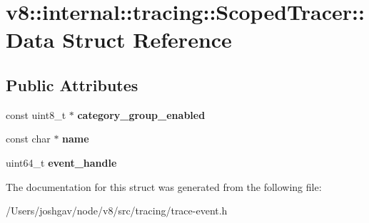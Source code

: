 \hypertarget{structv8_1_1internal_1_1tracing_1_1_scoped_tracer_1_1_data}{}\section{v8\+:\+:internal\+:\+:tracing\+:\+:Scoped\+Tracer\+:\+:Data Struct Reference}
\label{structv8_1_1internal_1_1tracing_1_1_scoped_tracer_1_1_data}
\subsection*{Public Attributes}
\begin{DoxyCompactItemize}
\item 
const uint8\+\_\+t $\ast$ {\bfseries category\+\_\+group\+\_\+enabled}\hypertarget{structv8_1_1internal_1_1tracing_1_1_scoped_tracer_1_1_data_aba3c14cfc0abee90f34482ca29ae26d3}{}\label{structv8_1_1internal_1_1tracing_1_1_scoped_tracer_1_1_data_aba3c14cfc0abee90f34482ca29ae26d3}

\item 
const char $\ast$ {\bfseries name}\hypertarget{structv8_1_1internal_1_1tracing_1_1_scoped_tracer_1_1_data_a77c0f1d3bad9bf811dc1403c6460cee6}{}\label{structv8_1_1internal_1_1tracing_1_1_scoped_tracer_1_1_data_a77c0f1d3bad9bf811dc1403c6460cee6}

\item 
uint64\+\_\+t {\bfseries event\+\_\+handle}\hypertarget{structv8_1_1internal_1_1tracing_1_1_scoped_tracer_1_1_data_a490036821d9ea4658410f0c0aafa9508}{}\label{structv8_1_1internal_1_1tracing_1_1_scoped_tracer_1_1_data_a490036821d9ea4658410f0c0aafa9508}

\end{DoxyCompactItemize}


The documentation for this struct was generated from the following file\+:\begin{DoxyCompactItemize}
\item 
/\+Users/joshgav/node/v8/src/tracing/trace-\/event.\+h\end{DoxyCompactItemize}
